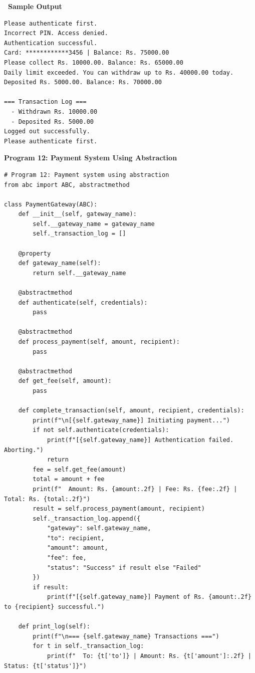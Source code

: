 \documentclass[12pt,a4paper]{article}
\newcommand{\outhead}{\noindent\colorbox{cmrgreen!25}%
  {\textbf{\small\color{cmrdark}~Sample Output~}}\par\vspace{-1pt}}
\begin{document}
\outhead
\begin{lstlisting}[style=outputstyle]
Please authenticate first.
Incorrect PIN. Access denied.
Authentication successful.
Card: ************3456 | Balance: Rs. 75000.00
Please collect Rs. 10000.00. Balance: Rs. 65000.00
Daily limit exceeded. You can withdraw up to Rs. 40000.00 today.
Deposited Rs. 5000.00. Balance: Rs. 70000.00

=== Transaction Log ===
  - Withdrawn Rs. 10000.00
  - Deposited Rs. 5000.00
Logged out successfully.
Please authenticate first.
\end{lstlisting}

\vspace{0.5cm}

\textbf{Program 12: Payment System Using Abstraction}

\begin{lstlisting}
# Program 12: Payment system using abstraction
from abc import ABC, abstractmethod

class PaymentGateway(ABC):
    def __init__(self, gateway_name):
        self.__gateway_name = gateway_name
        self._transaction_log = []

    @property
    def gateway_name(self):
        return self.__gateway_name

    @abstractmethod
    def authenticate(self, credentials):
        pass

    @abstractmethod
    def process_payment(self, amount, recipient):
        pass

    @abstractmethod
    def get_fee(self, amount):
        pass

    def complete_transaction(self, amount, recipient, credentials):
        print(f"\n[{self.gateway_name}] Initiating payment...")
        if not self.authenticate(credentials):
            print(f"[{self.gateway_name}] Authentication failed. Aborting.")
            return
        fee = self.get_fee(amount)
        total = amount + fee
        print(f"  Amount: Rs. {amount:.2f} | Fee: Rs. {fee:.2f} | Total: Rs. {total:.2f}")
        result = self.process_payment(amount, recipient)
        self._transaction_log.append({
            "gateway": self.gateway_name,
            "to": recipient,
            "amount": amount,
            "fee": fee,
            "status": "Success" if result else "Failed"
        })
        if result:
            print(f"[{self.gateway_name}] Payment of Rs. {amount:.2f} to {recipient} successful.")

    def print_log(self):
        print(f"\n=== {self.gateway_name} Transactions ===")
        for t in self._transaction_log:
            print(f"  To: {t['to']} | Amount: Rs. {t['amount']:.2f} | Status: {t['status']}")


\end{lstlisting}
\end{document}

